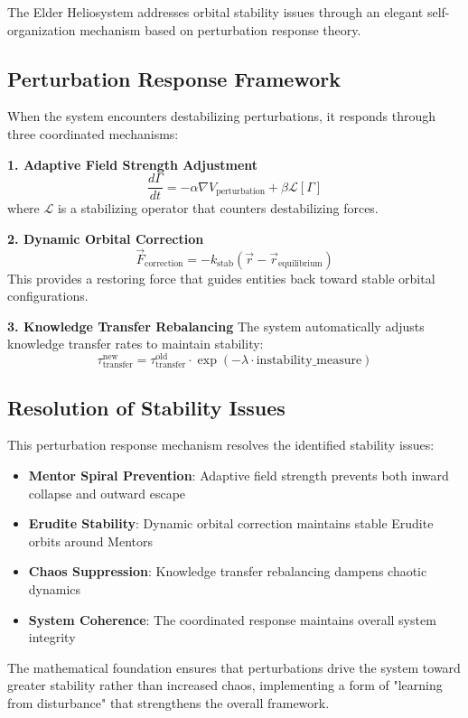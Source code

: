 The Elder Heliosystem addresses orbital stability issues through an elegant self-organization mechanism based on perturbation response theory.

\subsection{Perturbation Response Framework}

When the system encounters destabilizing perturbations, it responds through three coordinated mechanisms:

\textbf{1. Adaptive Field Strength Adjustment}
\begin{equation}
\frac{d\Gamma}{dt} = -\alpha \nabla V_{\text{perturbation}} + \beta \mathcal{L}[\Gamma]
\end{equation}
where $\mathcal{L}$ is a stabilizing operator that counters destabilizing forces.

\textbf{2. Dynamic Orbital Correction}
\begin{equation}
\vec{F}_{\text{correction}} = -k_{\text{stab}} (\vec{r} - \vec{r}_{\text{equilibrium}})
\end{equation}
This provides a restoring force that guides entities back toward stable orbital configurations.

\textbf{3. Knowledge Transfer Rebalancing}
The system automatically adjusts knowledge transfer rates to maintain stability:
\begin{equation}
\tau_{\text{transfer}}^{\text{new}} = \tau_{\text{transfer}}^{\text{old}} \cdot \exp(-\lambda \cdot \text{instability\_measure})
\end{equation}

\subsection{Resolution of Stability Issues}

This perturbation response mechanism resolves the identified stability issues:

\begin{itemize}
    \item \textbf{Mentor Spiral Prevention}: Adaptive field strength prevents both inward collapse and outward escape
    \item \textbf{Erudite Stability}: Dynamic orbital correction maintains stable Erudite orbits around Mentors
    \item \textbf{Chaos Suppression}: Knowledge transfer rebalancing dampens chaotic dynamics
    \item \textbf{System Coherence}: The coordinated response maintains overall system integrity
\end{itemize}

The mathematical foundation ensures that perturbations drive the system toward greater stability rather than increased chaos, implementing a form of "learning from disturbance" that strengthens the overall framework.

